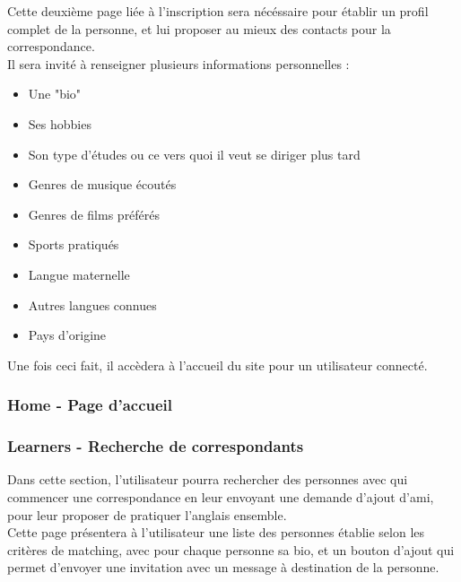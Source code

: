 \documentclass[a4paper,10pt,final,fleqn]{article}
\begin{document}
				Cette deuxième page liée à l'inscription sera nécéssaire pour établir un profil complet de la personne, et lui proposer au mieux des contacts pour la correspondance.\\
				Il sera invité à renseigner plusieurs informations personnelles : \\

				\begin{itemize}
					\item Une "bio"
					\item Ses hobbies
					\item Son type d'études ou ce vers quoi il veut se diriger plus tard
					\item Genres de musique écoutés
					\item Genres de films préférés
					\item Sports pratiqués
					\item Langue maternelle
					\item Autres langues connues
					\item Pays d'origine\\
				\end{itemize}


				Une fois ceci fait, il accèdera à l'accueil du site pour un utilisateur connecté.\\

			\subsubsection{Home - Page d'accueil}

				


			\subsubsection{Learners - Recherche de correspondants}

				Dans cette section, l'utilisateur pourra rechercher des personnes avec qui commencer une correspondance en leur envoyant une demande d'ajout d'ami, pour leur proposer de pratiquer l'anglais ensemble.\\

				Cette page présentera à l'utilisateur une liste des personnes établie selon les critères de matching, avec pour chaque personne sa bio, et un bouton d'ajout qui permet d'envoyer une invitation avec un message à destination de la personne.\\
\end{document}
